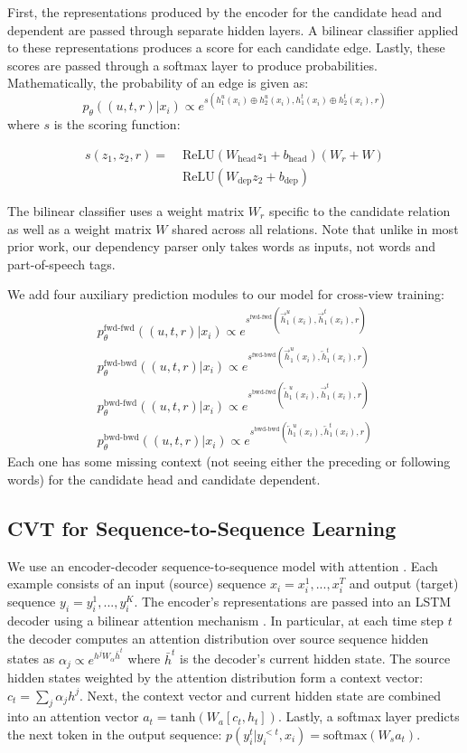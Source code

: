 \documentclass[11pt,a4paper]{article}
\newcommand{\alns}[1] {
	\begin{align*} #1 \end{align*}
}
\newcommand{\relu} {\text{ReLU}}
\newcommand{\hf} { \overrightarrow{h} }
\newcommand{\hb} { \overleftarrow{h} }
\newcommand{\mlph}[1] { \relu(W_{\text{head}}#1 + b_{\text{head}}) }
\newcommand{\mlpd}[1] { \relu(W_{\text{dep}}#1 + b_{\text{dep}}) }
\begin{document}
First, the representations produced by the encoder for the candidate head and dependent are passed through separate hidden layers. A bilinear classifier applied to these representations produces a score for each candidate edge. Lastly, these scores are passed through a softmax layer to produce probabilities. Mathematically, the probability of an edge is given as:
\[
p_\theta((u, t, r)|x_i) \propto e^{s(h_{1}^u(x_i) \oplus h_{2}^u(x_i), h_{1}^t(x_i) \oplus h_{2}^t(x_i), r)}
\]
where $s$ is the scoring function: 
\alns{
s(z_1, z_2, r) = \phantom{.}&\mlph{z_1}(W_r + W) \\ &\mlpd{z_2}
}
The bilinear classifier uses a weight matrix $W_r$ specific to the candidate relation as well as a weight matrix $W$ shared across all relations. Note that unlike in most prior work, our dependency parser only takes words as inputs, not words and part-of-speech tags.

We add four auxiliary prediction modules to our model for cross-view training:
\begin{align*}
	&p_\theta^{\text{fwd-fwd}}((u, t, r) | x_i) \propto e^{s^{\text{fwd-fwd}}(\hf_1^u(x_i), \hf_1^t(x_i), r)} \\ 
	& p_\theta^{\text{fwd-bwd}}((u, t, r) | x_i) \propto e^{s^{\text{fwd-bwd}}(\hf_1^u(x_i), \hb_1^t(x_i), r)} \quad \\
	&p_\theta^{\text{bwd-fwd}}((u, t, r) | x_i) \propto e^{s^{\text{bwd-fwd}}(\hb_1^u(x_i), \hf_1^t(x_i), r)} \\ 
	&p_\theta^{\text{bwd-bwd}}((u, t, r) | x_i)\propto e^{s^{\text{bwd-bwd}}(\hb_1^u(x_i), \hb_1^t(x_i), r)}
\end{align*}
Each one has some missing context (not seeing either the preceding or following words) for the candidate head and candidate dependent. 

\subsection{CVT for Sequence-to-Sequence Learning}
\label{sec:seq2seq}
We use an encoder-decoder sequence-to-sequence model with attention \citep{sutskever2014sequence,bahdanau2014neural}. Each example consists of an input (source) sequence $x_i = x^1_i, ..., x^T_i$ and output (target) sequence  $y_i = y^1_i, ..., y^K_i$. The encoder's representations are passed into an LSTM decoder using a bilinear attention mechanism \citep{Luong2015EffectiveAT}. In particular, at each time step $t$ the decoder computes an attention distribution over source sequence hidden states as $\alpha_j \propto e^{h^j W_\alpha \bar{h}^t}$ where $\bar{h}^t$ is the decoder's current hidden state. The source hidden states weighted by the attention distribution form a context vector: $c_t = \sum_j \alpha_j h^j$. Next, the context vector and current hidden state are combined into an attention vector $a_t = \text{tanh}(W_a[c_t, h_t])$. Lastly, a softmax layer predicts the next token in the output sequence: $p(y^t_i|y^{<t}_i, x_i) = \text{softmax}(W_s a_t)$.
\end{document}
